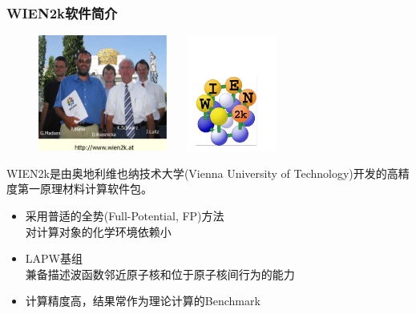 \frame
{
\frametitle{\textrm{WIEN2k}软件简介}
\begin{figure}[h!]
\centering
\vspace*{-0.16in}
\includegraphics[height=1.5in]{Figures/WIEN2k-Group.png}
\hskip 0.5pt
\includegraphics[height=1.5in,width=1.6in,viewport=13 35 475 515,clip]{Figures/logo_WIEN2k.pdf}
\label{Logo_of_WIEN2k}
\end{figure}
\textrm{WIEN2k}是由奥地利维也纳技术大学\textrm{(Vienna University of Technology)}开发的高精度第一原理材料计算软件包。%
\begin{itemize}
	\item 采用普适的全势\textrm{(Full-Potential, FP)}方法\\对计算对象的化学环境依赖小
	\item \textrm{LAPW}基组\\兼备描述波函数邻近原子核和位于原子核间行为的能力
	\item 计算精度高，结果常作为理论计算的\textrm{Benchmark}
\end{itemize}
}

